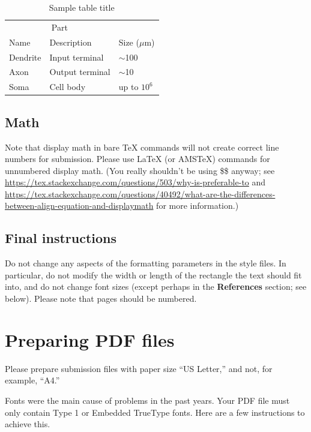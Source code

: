 \documentclass{article}
\begin{document}
\begin{CJK}{UTF8}{gbsn}
\begin{table}
  \caption{Sample table title}
  \label{sample-table}
  \centering
  \begin{tabular}{lll}
    \toprule
    \multicolumn{2}{c}{Part}                   \\
    \cmidrule(r){1-2}
    Name     & Description     & Size ($\mu$m) \\
    \midrule
    Dendrite & Input terminal  & $\sim$100     \\
    Axon     & Output terminal & $\sim$10      \\
    Soma     & Cell body       & up to $10^6$  \\
    \bottomrule
  \end{tabular}
\end{table}

\subsection{Math}
Note that display math in bare TeX commands will not create correct line numbers for submission. Please use LaTeX (or AMSTeX) commands for unnumbered display math. (You really shouldn't be using \$\$ anyway; see \url{https://tex.stackexchange.com/questions/503/why-is-preferable-to} and \url{https://tex.stackexchange.com/questions/40492/what-are-the-differences-between-align-equation-and-displaymath} for more information.)

\subsection{Final instructions}

Do not change any aspects of the formatting parameters in the style files.  In
particular, do not modify the width or length of the rectangle the text should
fit into, and do not change font sizes (except perhaps in the
\textbf{References} section; see below). Please note that pages should be
numbered.


\section{Preparing PDF files}


Please prepare submission files with paper size ``US Letter,'' and not, for
example, ``A4.''


Fonts were the main cause of problems in the past years. Your PDF file must only
contain Type 1 or Embedded TrueType fonts. Here are a few instructions to
achieve this.



\end{CJK}
\end{document}
